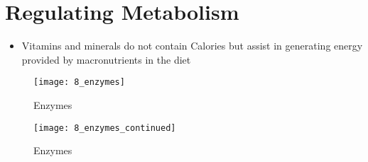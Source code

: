 \documentclass[title={Chapter 8}]{fdsn201notes}
\begin{document}

\section{Regulating Metabolism}\label{sec:regulating-metabolism}
\begin{itemize}
	\item Vitamins and minerals do not contain Calories but assist in generating energy provided by macronutrients in the diet
\end{itemize}

\begin{figure}[H]
	\centering
	\texttt{[image: 8\_enzymes]}
	\caption{Enzymes}
	\label{fig:enzymes}
\end{figure}

\begin{figure}[H]
	\centering
	\texttt{[image: 8\_enzymes\_continued]}
	\caption{Enzymes}
	\label{fig:enzymes_continued}
\end{figure}
\end{document}
